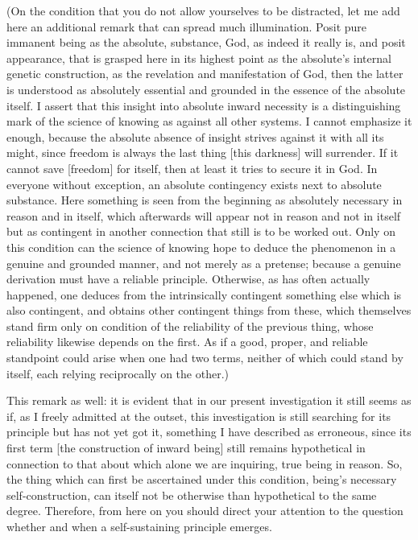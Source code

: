 (On the condition that you do not allow yourselves to be distracted,
let me add here an additional remark that can spread much illumination.
Posit pure immanent being as the absolute, substance, God,
as indeed it really is, and posit appearance,
that is grasped here in its highest point
as the absolute's internal genetic construction,
as the revelation and manifestation of God,
then the latter is understood as absolutely essential
and grounded in the essence of the absolute itself.
I assert that this insight into absolute inward necessity
is a distinguishing mark of the science of knowing
as against all other systems.
I cannot emphasize it enough,
because the absolute absence of insight
strives against it with all its might,
since freedom is always the last thing
[this darkness] will surrender.
If it cannot save [freedom] for itself,
then at least it tries to secure it in God.
In everyone without exception,
an absolute contingency exists
next to absolute substance.
Here something is seen from the beginning
as absolutely necessary in reason and in itself,
which afterwards will appear
not in reason and not in itself
but as contingent in another connection
that still is to be worked out.
Only on this condition can the science of knowing
hope to deduce the phenomenon in a genuine and grounded manner,
and not merely as a pretense;
because a genuine derivation must have a reliable principle.
Otherwise, as has often actually happened,
one deduces from the intrinsically contingent
something else which is also contingent,
and obtains other contingent things from these,
which themselves stand firm only on condition
of the reliability of the previous thing,
whose reliability likewise depends on the first.
As if a good, proper, and reliable
standpoint could arise when one had two terms,
neither of which could stand by itself,
each relying reciprocally on the other.)

This remark as well:
it is evident that in our present investigation
it still seems as if, as I freely admitted at the outset,
this investigation is still searching
for its principle but has not yet got it,
something I have described as erroneous,
since its first term [the construction of inward being]
still remains hypothetical in connection to that
about which alone we are inquiring, true being in reason.
So, the thing which can first be ascertained under this condition,
being's necessary self-construction,
can itself not be otherwise than hypothetical to the same degree.
Therefore, from here on you should direct your attention
to the question whether and when
a self-sustaining principle emerges.

